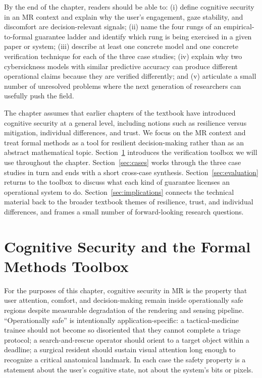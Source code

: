 \documentclass[graybox]{svmult}
\begin{document}
By the end of the chapter, readers should be able to: (i) define cognitive security in an MR context and explain why the user's engagement, gaze stability, and discomfort are decision-relevant signals; (ii) name the four rungs of an empirical-to-formal guarantee ladder and identify which rung is being exercised in a given paper or system; (iii) describe at least one concrete model and one concrete verification technique for each of the three case studies; (iv) explain why two cybersickness models with similar predictive accuracy can produce different operational claims because they are verified differently; and (v) articulate a small number of unresolved problems where the next generation of researchers can usefully push the field.

The chapter assumes that earlier chapters of the textbook have introduced cognitive security at a general level, including notions such as resilience versus mitigation, individual differences, and trust. We focus on the MR context and treat formal methods as a tool for resilient decision-making rather than as an abstract mathematical topic. Section~\ref{sec:foundations} introduces the verification toolbox we will use throughout the chapter. Section~\ref{sec:cases} works through the three case studies in turn and ends with a short cross-case synthesis. Section~\ref{sec:evaluation} returns to the toolbox to discuss what each kind of guarantee licenses an operational system to do. Section~\ref{sec:implications} connects the technical material back to the broader textbook themes of resilience, trust, and individual differences, and frames a small number of forward-looking research questions.

\section{Cognitive Security and the Formal Methods Toolbox}
\label{sec:foundations}

For the purposes of this chapter, cognitive security in MR is the property that user attention, comfort, and decision-making remain inside operationally safe regions despite measurable degradation of the rendering and sensing pipeline. ``Operationally safe'' is intentionally application-specific: a tactical-medicine trainee should not become so disoriented that they cannot complete a triage protocol; a search-and-rescue operator should orient to a target object within a deadline; a surgical resident should sustain visual attention long enough to recognize a critical anatomical landmark. In each case the safety property is a statement about the user's cognitive state, not about the system's bits or pixels.
\end{document}
